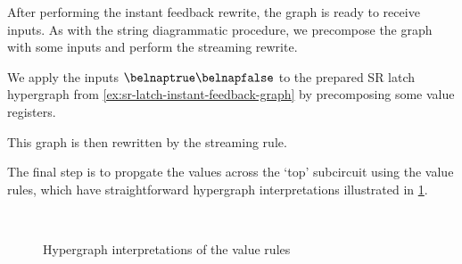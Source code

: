 After performing the instant feedback rewrite, the graph is ready to receive
inputs.
As with the string diagrammatic procedure, we precompose the graph with some
inputs and perform the streaming rewrite.

\begin{example}\label{ex:sr-latch-streaming-graph}
    We apply the inputs \(\belnaptrue\belnapfalse\) to the prepared SR latch
    hypergraph from \cref{ex:sr-latch-instant-feedback-graph} by precomposing
    some value registers.
    \begin{center}
    \end{center}
    This graph is then rewritten by the streaming rule.
    \begin{center}
    \end{center}
\end{example}

The final step is to propgate the values across the `top' subcircuit using the
value rules, which have straightforward hypergraph interpretations illustrated
in \cref{fig:graph-values}.

\begin{figure}
    \scalebox{0.8}{}
    \quad
    \scalebox{0.8}{}
    \\
    \scalebox{0.8}{}
    \quad
    \scalebox{0.8}{}
    \caption{Hypergraph interpretations of the value rules}
    \label{fig:graph-values}
\end{figure}

